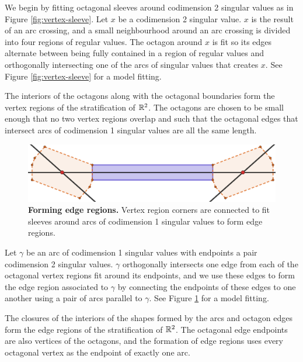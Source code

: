 We begin by fitting octagonal sleeves around codimension 2 singular values as in Figure \ref{fig:vertex-sleeve}.
Let $x$ be a codimension 2 singular value.
$x$ is the result of an arc crossing, and a small neighbourhood around an arc crossing is divided into four regions of regular values.
The octagon around $x$ is fit so its edges alternate between being fully contained in a region of regular values and orthogonally intersecting one of the arcs of singular values that creates $x$.
See Figure \ref{fig:vertex-sleeve} for a model fitting.

The interiors of the octagons along with the octagonal boundaries form the vertex regions of the stratification of $\mathbb{R}^2$.
The octagons are chosen to be small enough that no two vertex regions overlap and such that the octagonal edges that intersect arcs of codimension 1 singular values are all the same length.

\begin{figure}[h!]
	\centering
	\includegraphics[width=\textwidth]{figures/edge-sleeve.png}
	\caption{
		\textbf{Forming edge regions.}
		Vertex region corners are connected to fit sleeves around arcs of codimension 1 singular values to form edge regions.
	}
	\label{fig:edge-sleeve}
\end{figure}

Let $\gamma$ be an arc of codimension 1 singular values with endpoints a pair codimension 2 singular values.
$\gamma$ orthogonally intersects one edge from each of the octagonal vertex regions fit around its endpoints, and we use these edges to form the edge region associated to $\gamma$ by connecting the endpoints of these edges to one another using a pair of arcs parallel to $\gamma$.
See Figure \ref{fig:edge-sleeve} for a model fitting.

The closures of the interiors of the shapes formed by the arcs and octagon edges form the edge regions of the stratification of $\mathbb{R}^2$.
The octagonal edge endpoints are also vertices of the octagons, and the formation of edge regions uses every octagonal vertex as the endpoint of exactly one arc.

